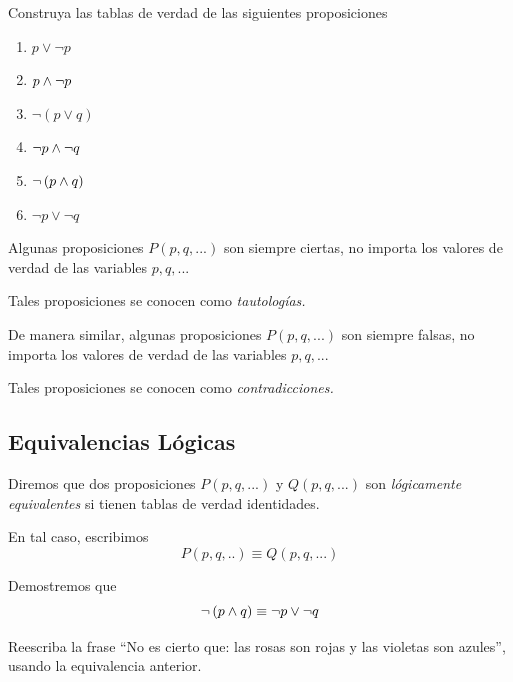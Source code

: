 \begin{problema} Construya las tablas de verdad de las siguientes proposiciones
\begin{enumerate}
 \item $p\vee \neg p$
 \item $p\wedge \neg p$
 \item $\neg\left( p \vee q \right)$
 \item $\neg p \wedge \neg q$
 \item $\neg\left( p \wedge q \right)$
 \item $\neg p \vee \neg q$
\end{enumerate}


\end{problema}


 Algunas proposiciones $P(p,q,...)$ son siempre ciertas, no importa los valores de verdad de las variables $p,q,...$ 
  
 
 Tales proposiciones se conocen como \emph{tautologías.}



 De manera similar, algunas proposiciones $P(p,q,...)$ son siempre falsas, no importa los valores de verdad de las variables $p,q,...$ 
  
 
 Tales proposiciones se conocen como \emph{contradicciones.}






\subsection{Equivalencias Lógicas}


 Diremos que dos proposiciones $P(p,q,...)$ y $Q(p,q,...)$ son \emph{lógicamente equivalentes} si tienen tablas de verdad identidades. 
 
 
 En tal caso, escribimos $$P(p,q,..)\equiv Q(p,q,...)$$



 \begin{problema} Demostremos que 
  $$
  \neg\left( p \wedge q \right) \equiv \neg p \vee \neg q
  $$
 \end{problema}




 \begin{problema}
  Reescriba la frase ``No es cierto que: las rosas son rojas y las violetas son azules'', usando la equivalencia anterior.
 \end{problema}



